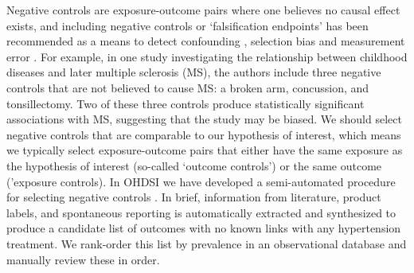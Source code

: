 \documentclass[]{book}
\begin{document}
Negative controls are exposure-outcome pairs where one believes no
causal effect exists, and including negative controls or `falsification
endpoints' \citep{prased_2013} has been recommended as a means to detect
confounding \citep{lipsitch_2010}, selection bias and measurement error
\citep{arnold_2016}. For example, in one study \citep{zaadstra_2008}
investigating the relationship between childhood diseases and later
multiple sclerosis (MS), the authors include three negative controls
that are not believed to cause MS: a broken arm, concussion, and
tonsillectomy. Two of these three controls produce statistically
significant associations with MS, suggesting that the study may be
biased. We should select negative controls that are comparable to our
hypothesis of interest, which means we typically select exposure-outcome
pairs that either have the same exposure as the hypothesis of interest
(so-called `outcome controls') or the same outcome ('exposure controls).
In OHDSI we have developed a semi-automated procedure for selecting
negative controls \citep{voss_2016}. In brief, information from
literature, product labels, and spontaneous reporting is automatically
extracted and synthesized to produce a candidate list of outcomes with
no known links with any hypertension treatment. We rank-order this list
by prevalence in an observational database and manually review these in
order.
\end{document}

